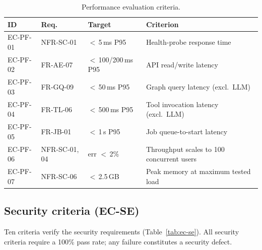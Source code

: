 \documentclass[a4paper,noexaminfo]{sapthesis}
\begin{document}
\begin{table}[ht]
\centering
\caption{Performance evaluation criteria.}
\label{tab:ec-pf}
\small
\begin{tabularx}{\textwidth}{@{}l l l X@{}}
    \hline
    \textbf{ID} & \textbf{Req.} & \textbf{Target} &
        \textbf{Criterion} \\
    \hline
    EC-PF-01 & NFR-SC-01 & $<$\,5\,ms P95 &
        Health-probe response time \\
    EC-PF-02 & FR-AE-07 & $<$\,100/200\,ms P95 &
        API read/write latency \\
    EC-PF-03 & FR-GQ-09 & $<$\,50\,ms P95 &
        Graph query latency (excl.\ LLM) \\
    EC-PF-04 & FR-TL-06 & $<$\,500\,ms P95 &
        Tool invocation latency (excl.\ LLM) \\
    EC-PF-05 & FR-JB-01 & $<$\,1\,s P95 &
        Job queue-to-start latency \\
    EC-PF-06 & NFR-SC-01, 04 & err $<$\,2\% &
        Throughput scales to 100 concurrent users \\
    EC-PF-07 & NFR-SC-06 & $<$\,2.5\,GB &
        Peak memory at maximum tested load \\
    \hline
\end{tabularx}
\end{table}

\subsection{Security criteria (EC-SE)}

Ten criteria verify the security requirements
(Table~\ref{tab:ec-se}).  All security criteria require a 100\% pass
rate; any failure constitutes a security defect.
\end{document}
